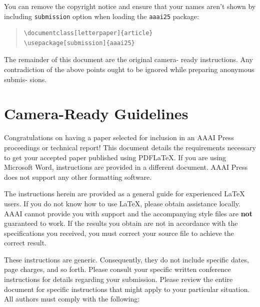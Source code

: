 \documentclass[letterpaper]{article} %
\begin{document}
You can remove the copyright notice and ensure that your names aren't shown by including \texttt{submission} option when loading the \texttt{aaai25} package:

\begin{quote}\begin{scriptsize}\begin{verbatim}
\documentclass[letterpaper]{article}
\usepackage[submission]{aaai25}
\end{verbatim}\end{scriptsize}\end{quote}

The remainder of this document are the original camera-
ready instructions. Any contradiction of the above points
ought to be ignored while preparing anonymous submis-
sions.

\section{Camera-Ready Guidelines}

Congratulations on having a paper selected for inclusion in an AAAI Press proceedings or technical report! This document details the requirements necessary to get your accepted paper published using PDF\LaTeX{}. If you are using Microsoft Word, instructions are provided in a different document. AAAI Press does not support any other formatting software.

The instructions herein are provided as a general guide for experienced \LaTeX{} users. If you do not know how to use \LaTeX{}, please obtain assistance locally. AAAI cannot provide you with support and the accompanying style files are \textbf{not} guaranteed to work. If the results you obtain are not in accordance with the specifications you received, you must correct your source file to achieve the correct result.

These instructions are generic. Consequently, they do not include specific dates, page charges, and so forth. Please consult your specific written conference instructions for details regarding your submission. Please review the entire document for specific instructions that might apply to your particular situation. All authors must comply with the following:
\end{document}
